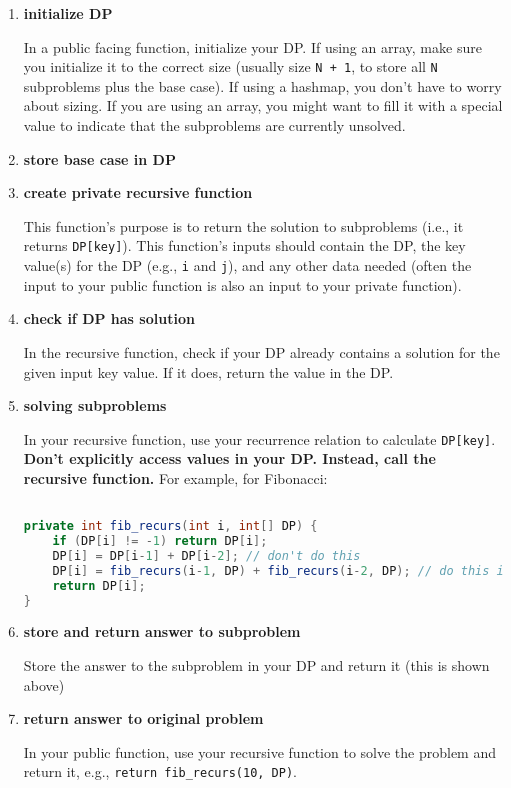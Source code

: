 \documentclass{article}
\begin{document}
\begin{enumerate}

    \item \textbf{initialize DP}
    
In a public facing function, initialize your DP. If using an array, make sure you initialize it to the correct size (usually size \texttt{N + 1}, to store all \texttt{N} subproblems plus the base case). If using a hashmap, you don't have to worry about sizing. If you are using an array, you might want to fill it with a special value to indicate that the subproblems are currently unsolved.

    \item \textbf{store base case in DP}
    
    \item \textbf{create private recursive function}

This function's purpose is to return the solution to subproblems (i.e., it returns \texttt{DP[key]}). This function's inputs should contain the DP, the key value(s) for the DP (e.g., \texttt{i} and \texttt{j}), and any other data needed (often the input to your public function is also an input to your private function).
    
    \item \textbf{check if DP has solution}

In the recursive function, check if your DP already contains a solution for the given input key value. If it does, return the value in the DP.
    
    \item \textbf{solving subproblems}
    
In your recursive function, use your recurrence relation to calculate \texttt{DP[key]}. \textbf{Don't explicitly access values in your DP. Instead, call the recursive function.} For example, for Fibonacci:

\begin{lstlisting}[language=Java]

private int fib_recurs(int i, int[] DP) {
    if (DP[i] != -1) return DP[i];
    DP[i] = DP[i-1] + DP[i-2]; // don't do this
    DP[i] = fib_recurs(i-1, DP) + fib_recurs(i-2, DP); // do this instead
    return DP[i];
}

\end{lstlisting}

    \item \textbf{store and return answer to subproblem}
 
Store the answer to the subproblem in your DP and return it (this is shown above)

    \item \textbf{return answer to original problem}
    
    In your public function, use your recursive function to solve the problem and return it, e.g., \texttt{return fib\_recurs(10, DP)}.
    
\end{enumerate}
\end{document}
